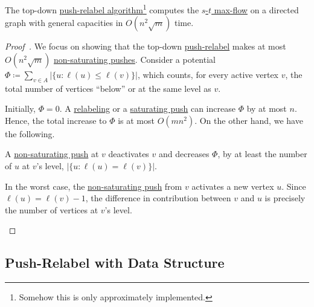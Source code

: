 \begin{theorem}
	The top-down \hyperref[algo:push-relabel]{push-relabel algorithm}\footnote{Somehow this is only approximately implemented.} computes the \hyperref[prb:s-t-max-flow]{\(s\)-\(t\) max-flow} on a directed graph with general capacities in \(O(n^2 \sqrt{m} )\) time.
\end{theorem}
\begin{proof}[Proof~\cite{cheriyan1999analysis}]
	We focus on showing that the top-down \hyperref[algo:push-relabel]{push-relabel} makes at most \(O(n^2 \sqrt{m} )\) \hyperref[algo:push-relabel-push-non-saturating]{non-saturating pushes}. Consider a potential \(\Phi \coloneqq \sum_{v \in A} \lvert \{ u \colon \ell (u) \leq \ell (v) \} \rvert\), which counts, for every active vertex \(v\), the total number of vertices ``below'' or at the same level as \(v\).

	Initially, \(\Phi = 0\). A \hyperref[algo:push-relabel-relabel]{relabeling} or a \hyperref[algo:push-relabel-push-saturating]{saturating push} can increase \(\Phi \) by at most \(n\). Hence, the total increase to \(\Phi \) is at most \(O(mn^2)\). On the other hand, we have the following.

	\begin{claim}
		A \hyperref[algo:push-relabel-push-non-saturating]{non-saturating push} at \(v\) deactivates \(v\) and decreases \(\Phi \), by at least the number of \(u\) at \(v\)'s level, \(\lvert \{ u \colon \ell (u) = \ell (v) \}  \rvert \).
	\end{claim}
	\begin{explanation}
		In the worst case, the \hyperref[algo:push-relabel-push-non-saturating]{non-saturating push} from \(v\) activates a new vertex \(u\). Since \(\ell (u) = \ell (v) - 1\), the difference in contribution between \(v\) and \(u\) is precisely the number of vertices at \(v\)'s level.
	\end{explanation}

\end{proof}



\subsection{Push-Relabel with Data Structure}
